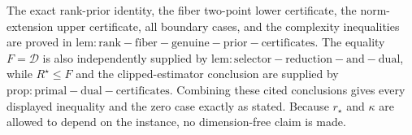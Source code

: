 The exact rank-prior identity, the fiber two-point lower certificate, the norm-extension upper certificate, all boundary cases, and the complexity inequalities are proved in \(\mathrm{lem:rank-fiber-genuine-prior-certificates}\). The equality \(F=\mathcal D\) is also independently supplied by \(\mathrm{lem:selector-reduction-and-dual}\), while \(R^{\star}\le F\) and the clipped-estimator conclusion are supplied by \(\mathrm{prop:primal-dual-certificates}\). Combining these cited conclusions gives every displayed inequality and the zero case exactly as stated. Because \(r_{\star}\) and \(\kappa\) are allowed to depend on the instance, no dimension-free claim is made.